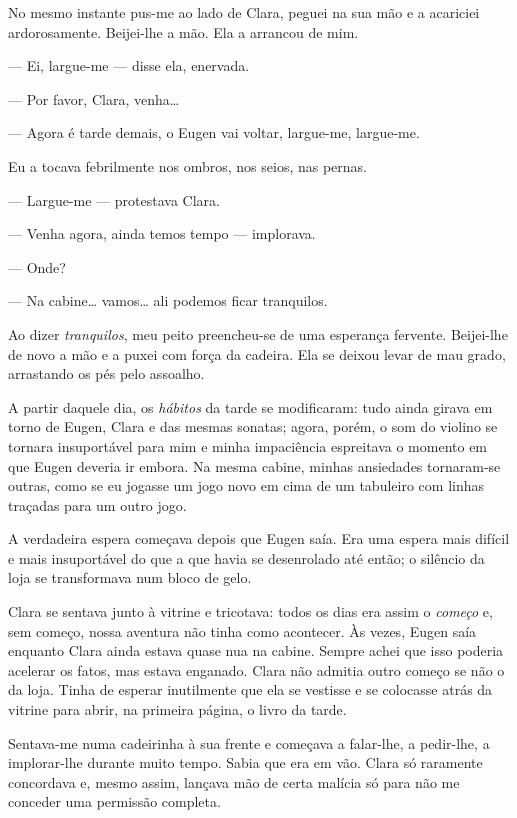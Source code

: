 No mesmo instante pus-me ao lado de Clara, peguei na sua mão e a acariciei ardorosamente. Beijei-lhe a mão. Ela a arrancou de mim.

--- Ei, largue-me --- disse ela, enervada.

--- Por favor, Clara, venha\ldots{}

--- Agora é tarde demais, o Eugen vai voltar, largue-me, largue-me.

Eu a tocava febrilmente nos ombros, nos seios, nas pernas.

--- Largue-me --- protestava Clara.

--- Venha agora, ainda temos tempo --- implorava.

--- Onde?

--- Na cabine\ldots{} vamos\ldots{} ali podemos ficar tranquilos.

Ao dizer \textit{tranquilos}, meu peito preencheu-se de uma esperança fervente. Beijei-lhe de novo a mão e a puxei com força da cadeira. Ela se deixou levar de mau grado, arrastando os pés pelo assoalho.

A partir daquele dia, os \textit{hábitos} da tarde se modificaram: tudo ainda girava em torno de Eugen, Clara e das mesmas sonatas; agora, porém, o som do violino se tornara insuportável para mim e minha impaciência espreitava o momento em que Eugen deveria ir embora. Na mesma cabine, minhas ansiedades tornaram-se outras, como se eu jogasse um jogo novo em cima de um tabuleiro com linhas traçadas para um outro jogo. 

A verdadeira espera começava depois que Eugen saía. Era uma espera mais difícil e mais insuportável do que a que havia se desenrolado até então; o silêncio da loja se transformava num bloco de gelo.

Clara se sentava junto à vitrine e tricotava: todos os dias era assim o \textit{começo} e, sem começo, nossa aventura não tinha como acontecer. Às vezes, Eugen saía enquanto Clara ainda estava quase nua na cabine. Sempre achei que isso poderia acelerar os fatos, mas estava enganado. Clara não admitia outro começo se não o da loja. Tinha de esperar inutilmente que ela se vestisse e se colocasse atrás da vitrine para abrir, na primeira página, o livro da tarde.

Sentava-me numa cadeirinha à sua frente e começava a falar-lhe, a pedir-lhe, a implorar-lhe durante muito tempo. Sabia que era em vão. Clara só raramente concordava e, mesmo assim, lançava mão de certa malícia só para não me conceder uma permissão completa.

